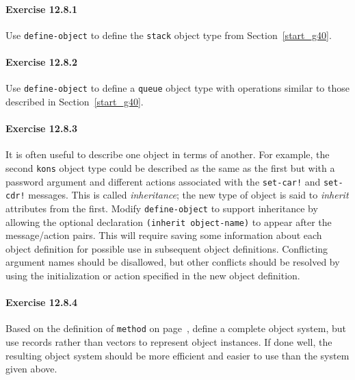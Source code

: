 \paragraph{Exercise \label{examples_g194}12.8.1}


\label{examples_s64}Use \texttt{define-object} to define the \texttt{stack} object type from
Section \ref{start_g40}.


\paragraph{Exercise \label{examples_g195}12.8.2}


\label{examples_s65}Use \texttt{define-object} to define a \texttt{queue} object type
with operations similar to those described in
Section \ref{start_g40}.


\paragraph{Exercise \label{examples_g196}12.8.3}


\label{examples_s66}It is often useful to describe one object in terms of another.
For example, the second \texttt{kons} object type could be described
as the same as the first but with a password argument and different
actions associated with the \texttt{set-car!} and \texttt{set-cdr!}
messages.
This is called \label{examples_s67}\textit{inheritance}; the new type of object is said to
\textit{inherit} attributes from the first.
Modify \texttt{define-object} to support inheritance by allowing
the optional declaration \texttt{(inherit object-name)} to appear
after the message/action pairs.
This will require saving some information about each object definition
for possible use in subsequent object definitions.
Conflicting argument names should be disallowed, but other conflicts
should be resolved by using the initialization or action specified in
the new object definition.



\paragraph{Exercise \label{examples_g197}12.8.4}


\label{examples_s68}Based on the definition of \texttt{method} on page \pageref{syntax_defn_method},
define a complete object system, but use records rather than vectors to
represent object instances.
If done well, the resulting object system should be more efficient and
easier to use than the system given above.



